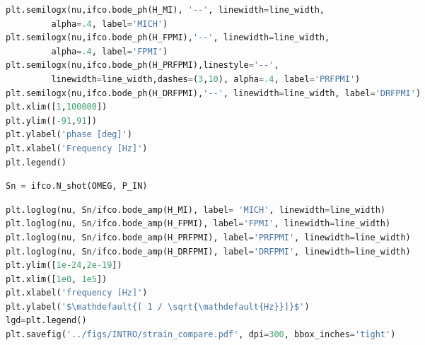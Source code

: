 \begin{spacing}{1.2}\begin{lstlisting}[frame=single, language=Python]
plt.semilogx(nu,ifco.bode_ph(H_MI), '--', linewidth=line_width, 
	     alpha=.4, label='MICH')
plt.semilogx(nu,ifco.bode_ph(H_FPMI),'--', linewidth=line_width, 
	     alpha=.4, label='FPMI')
plt.semilogx(nu,ifco.bode_ph(H_PRFPMI),linestyle='--', 
	     linewidth=line_width,dashes=(3,10), alpha=.4, label='PRFPMI')
plt.semilogx(nu,ifco.bode_ph(H_DRFPMI),'--', linewidth=line_width, label='DRFPMI')
plt.xlim([1,100000])
plt.ylim([-91,91])
plt.ylabel('phase [deg]')
plt.xlabel('Frequency [Hz]')
plt.legend()
\end{lstlisting}\end{spacing}

\begin{spacing}{1.2}\begin{lstlisting}[frame=single, language=Python]
Sn = ifco.N_shot(OMEG, P_IN)
\end{lstlisting}\end{spacing}

\begin{spacing}{1.2}\begin{lstlisting}[frame=single, language=Python]
plt.loglog(nu, Sn/ifco.bode_amp(H_MI), label= 'MICH', linewidth=line_width)
plt.loglog(nu, Sn/ifco.bode_amp(H_FPMI), label='FPMI', linewidth=line_width)
plt.loglog(nu, Sn/ifco.bode_amp(H_PRFPMI), label='PRFPMI', linewidth=line_width)
plt.loglog(nu, Sn/ifco.bode_amp(H_DRFPMI), label='DRFPMI', linewidth=line_width)
plt.ylim([1e-24,2e-19])
plt.xlim([1e0, 1e5])
plt.xlabel('frequency [Hz]')
plt.ylabel('$\mathdefault{[ 1 / \sqrt{\mathdefault{Hz}}]}$')
lgd=plt.legend()
plt.savefig('../figs/INTRO/strain_compare.pdf', dpi=300, bbox_inches='tight')
\end{lstlisting}\end{spacing}

